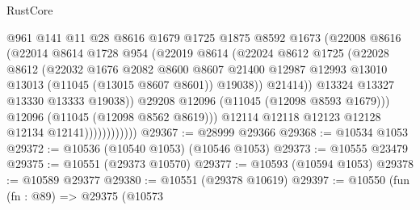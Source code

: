 \begin{lexlean}{RustCore}
\begin{coremodule}
                                @961
                                @141
                                @11
                                @28
                                @8616
                                @1679
                                @1725
                                @1875
                                @8592
                                @1673
                                (@22008
                                  @8616
                                  (@22014
                                    @8614
                                    @1728
                                    @954
                                    (@22019
                                      @8614
                                      (@22024
                                        @8612
                                        @1725
                                        (@22028
                                          @8612
                                          (@22032
                                            @1676
                                            @2082
                                            @8600
                                            @8607
                                            @21400
                                            @12987
                                            @12993
                                            @13010
                                            @13013
                                            (@11045 (@13015 @8607 @8601))
                                            @19038))
                                        @21414))
                                    @13324
                                    @13327
                                    @13330
                                    @13333
                                    @19038))
                                @29208
                                @12096
                                (@11045 (@12098 @8593 @1679)))
                              @12096
                              (@11045 (@12098 @8562 @8619)))
                            @12114
                            @12118
                            @12123
                            @12128
                            @12134
                            @12141))))))))))))
@29367 := @28999 @29366
@29368 := @10534 @1053
@29372 := @10536 (@10540 @1053) (@10546 @1053)
@29373 := @10555 @23479
@29375 := @10551 (@29373 @10570)
@29377 := @10593 (@10594 @1053)
@29378 := @10589 @29377
@29380 := @10551 (@29378 @10619)
@29397 := @10550
    (fun (fn : @89) =>
    @29375
      (@10573

\end{coremodule}
\end{lexlean}
